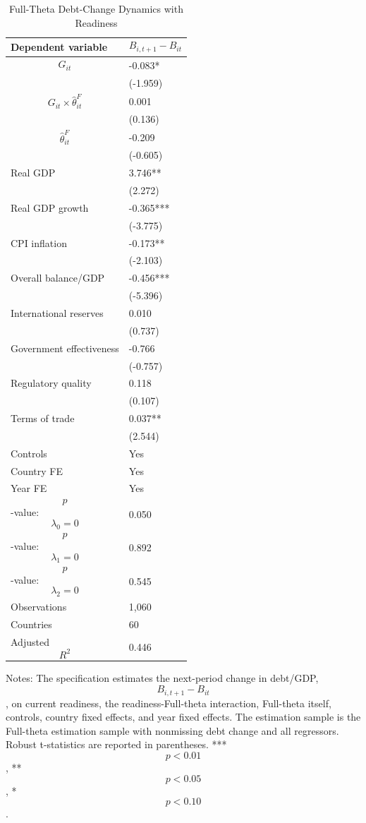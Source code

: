 \begin{table}[H]\centering
\begin{threeparttable}
\caption{Full-Theta Debt-Change Dynamics with Readiness}
\label{tab:debt_change_fulltheta_readiness}
\scriptsize
\begin{tabularx}{\textwidth}{lY}
\toprule
Dependent variable & $$B_{i,t+1}-B_{it}$$ \\
\midrule
$$G_{it}$$ & -0.083* \\
 & (-1.959) \\
$$G_{it}\times\widehat{\theta}^{F}_{it}$$ & 0.001 \\
 & (0.136) \\
$$\widehat{\theta}^{F}_{it}$$ & -0.209 \\
 & (-0.605) \\
Real GDP & 3.746** \\
 & (2.272) \\
Real GDP growth & -0.365*** \\
 & (-3.775) \\
CPI inflation & -0.173** \\
 & (-2.103) \\
Overall balance/GDP & -0.456*** \\
 & (-5.396) \\
International reserves & 0.010 \\
 & (0.737) \\
Government effectiveness & -0.766 \\
 & (-0.757) \\
Regulatory quality & 0.118 \\
 & (0.107) \\
Terms of trade & 0.037** \\
 & (2.544) \\
\midrule
Controls & Yes \\
Country FE & Yes \\
Year FE & Yes \\
$$p$$-value: $$\lambda_0=0$$ & 0.050 \\
$$p$$-value: $$\lambda_1=0$$ & 0.892 \\
$$p$$-value: $$\lambda_2=0$$ & 0.545 \\
Observations & 1,060 \\
Countries & 60 \\
Adjusted $$R^2$$ & 0.446 \\
\bottomrule
\end{tabularx}
\begin{tablenotes}[flushleft]\footnotesize
\item Notes: The specification estimates the next-period change in debt/GDP, $$B_{i,t+1}-B_{it}$$, on current readiness, the readiness-Full-theta interaction, Full-theta itself, controls, country fixed effects, and year fixed effects. The estimation sample is the Full-theta estimation sample with nonmissing debt change and all regressors. Robust t-statistics are reported in parentheses. *** $$p<0.01$$, ** $$p<0.05$$, * $$p<0.10$$.
\end{tablenotes}
\end{threeparttable}
\end{table}
